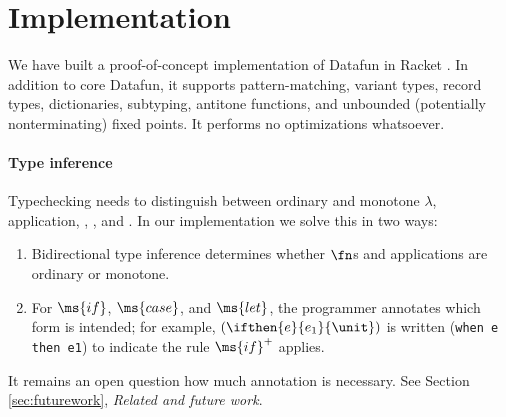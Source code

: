 \section{Implementation}
We have built a proof-of-concept implementation of Datafun in Racket
. In addition to core Datafun, it supports
pattern-matching, variant types, record types, dictionaries,
subtyping, antitone functions, and unbounded (potentially
nonterminating) fixed points. It performs no optimizations whatsoever.


\paragraph{Type inference} Typechecking needs to distinguish between ordinary
and monotone $\lambda$, application, , , and . In our
implementation we solve this in two ways:
\begin{enumerate}
\item Bidirectional type inference  determines whether $\fn$s and
  applications are ordinary or monotone.
\item For $\ms{if}$, $\ms{case}$, and $\ms{let}$, the programmer annotates which
  form is intended; for example, $(\ifthen{e}{e_1}{\unit})$ is written
  (\texttt{when e then e1}) to indicate the rule $\ms{if}^+$ applies.
\end{enumerate}

It remains an open question how much annotation is necessary. See
Section \ref{sec:futurework}, \emph{Related and future work}.

